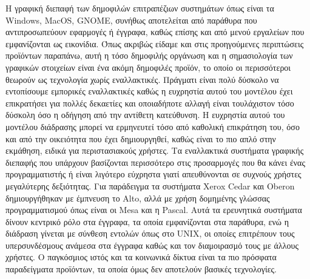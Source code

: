 \documentclass[
]{article}
\begin{document}
Η γραφική διεπαφή των δημοφιλών επιτραπέζιων συστημάτων όπως είναι τα
Windows, MacOS, GNOME, συνήθως αποτελείται από παράθυρα που
αντιπροσωπεύουν εφαρμογές ή έγγραφα, καθώς επίσης και από μενού
εργαλείων που εμφανίζονται ως εικονίδια. Όπως ακριβώς είδαμε και στις
προηγούμενες περιπτώσεις προϊόντων παραπάνω, αυτή η τόσο δημοφιλής
οργάνωση και η σημασιολογία των γραφικών στοιχείων είναι ένα ακόμη
δημοφιλές προϊόν, το οποίο οι περισσότεροι θεωρούν ως τεχνολογία χωρίς
εναλλακτικές. Πράγματι είναι πολύ δύσκολο να εντοπίσουμε εμπορικές
εναλλακτικές καθώς η ευχρηστία αυτού του μοντέλου έχει επικρατήσει για
πολλές δεκαετίες και οποιαδήποτε αλλαγή είναι τουλάχιστον τόσο δύσκολη
όσο η οδήγηση από την αντίθετη κατεύθυνση. Η ευχρηστία αυτού του
μοντέλου διάδρασης μπορεί να ερμηνευτεί τόσο από καθολική επικράτηση
του, όσο και από την οικειότητα που έχει δημιουργηθεί, καθώς είναι το
πιο απλό στην εκμάθηση, ειδικά για περιστασιακούς χρήστες. Τα
εναλλακτικά συστήματα γραφικής διεπαφής που υπάρχουν βασίζονται
περισσότερο στις προσαρμογές που θα κάνει ένας προγραμματιστής ή είναι
λιγότερο εύχρηστα γιατί απευθύνονται σε συχνούς χρήστες μεγαλύτερης
δεξιότητας. Για παράδειγμα τα συστήματα Xerox Cedar και Oberon
δημιουργήθηκαν με έμπνευση το Alto, αλλά με χρήση δομημένης γλώσσας
προγραμματισμού όπως είναι οι Mesa και η Pascal. Αυτά τα ερευνητικά
συστήματα δίνουν κεντρικό ρόλο στα έγγραφα, τα οποία εμφανίζονται στα
παράθυρα, ενώ η διάδραση γίνεται με σύνθεση εντολών όπως στο UNIX, οι
οποίες επιτρέπουν τους υπερσυνδέσμους ανάμεσα στα έγγραφα καθώς και τον
διαμοιρασμό τους με άλλους χρήστες. Ο παγκόσμιος ιστός και τα κοινωνικά
δίκτυα είναι τα πιο πρόσφατα παραδείγματα προϊόντων, τα οποία όμως δεν
αποτελούν βασικές τεχνολογίες.
\end{document}
